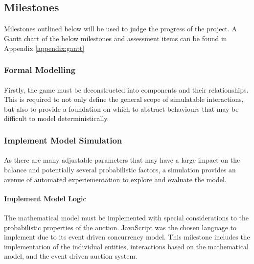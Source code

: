 \subsection{Milestones}

\paragraph{} Milestones outlined below will be used to judge the progress of the project. A Gantt chart of the below milestones and assessment items can be found in Appendix \ref{appendix:gantt}

\subsubsection{Formal Modelling}

\paragraph{} Firstly, the game must be deconstructed into components and their relationships. This is required to not only define the general scope of simulatable interactions, but also to provide a foundation on which to abstract behaviours that may be difficult to model deterministically.

\subsubsection{Implement Model Simulation}

\paragraph{} As there are many adjustable parameters that may have a large impact on the balance and potentially several probabilistic factors, a simulation provides an avenue of automated experiementation to explore and evaluate the model.

\paragraph{Implement Model Logic}

\paragraph{} The mathematical model must be implemented with special considerations to the probabilistic properties of the auction.  JavaScript was the chosen language to implement due to its event driven concurrency model. This milestone includes the implementation of the individual entities, interactions based on the mathematical model, and the event driven auction system.

